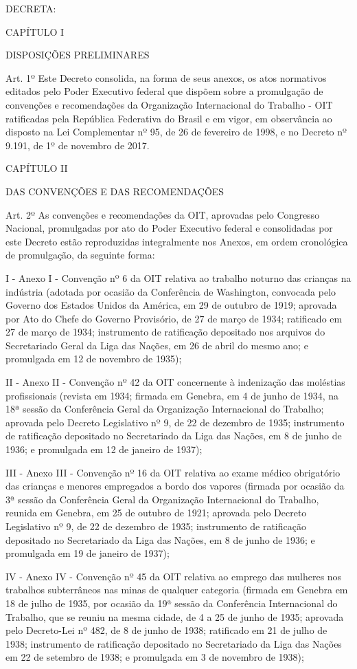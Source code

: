 \documentclass[
]{book}
\begin{document}
DECRETA:

CAPÍTULO I

DISPOSIÇÕES PRELIMINARES

Art. 1º Este Decreto consolida, na forma de seus anexos, os atos normativos editados pelo Poder Executivo federal que dispõem sobre a promulgação de convenções e recomendações da Organização Internacional do Trabalho - OIT ratificadas pela República Federativa do Brasil e em vigor, em observância ao disposto na Lei Complementar nº 95, de 26 de fevereiro de 1998, e no Decreto nº 9.191, de 1º de novembro de 2017.

CAPÍTULO II

DAS CONVENÇÕES E DAS RECOMENDAÇÕES

Art. 2º As convenções e recomendações da OIT, aprovadas pelo Congresso Nacional, promulgadas por ato do Poder Executivo federal e consolidadas por este Decreto estão reproduzidas integralmente nos Anexos, em ordem cronológica de promulgação, da seguinte forma:

I - Anexo I - Convenção nº 6 da OIT relativa ao trabalho noturno das crianças na indústria (adotada por ocasião da Conferência de Washington, convocada pelo Governo dos Estados Unidos da América, em 29 de outubro de 1919; aprovada por Ato do Chefe do Governo Provisório, de 27 de março de 1934; ratificado em 27 de março de 1934; instrumento de ratificação depositado nos arquivos do Secretariado Geral da Liga das Nações, em 26 de abril do mesmo ano; e promulgada em 12 de novembro de 1935);

II - Anexo II - Convenção nº 42 da OIT concernente à indenização das moléstias profissionais (revista em 1934; firmada em Genebra, em 4 de junho de 1934, na 18ª sessão da Conferência Geral da Organização Internacional do Trabalho; aprovada pelo Decreto Legislativo nº 9, de 22 de dezembro de 1935; instrumento de ratificação depositado no Secretariado da Liga das Nações, em 8 de junho de 1936; e promulgada em 12 de janeiro de 1937);

III - Anexo III - Convenção nº 16 da OIT relativa ao exame médico obrigatório das crianças e menores empregados a bordo dos vapores (firmada por ocasião da 3ª sessão da Conferência Geral da Organização Internacional do Trabalho, reunida em Genebra, em 25 de outubro de 1921; aprovada pelo Decreto Legislativo nº 9, de 22 de dezembro de 1935; instrumento de ratificação depositado no Secretariado da Liga das Nações, em 8 de junho de 1936; e promulgada em 19 de janeiro de 1937);

IV - Anexo IV - Convenção nº 45 da OIT relativa ao emprego das mulheres nos trabalhos subterrâneos nas minas de qualquer categoria (firmada em Genebra em 18 de julho de 1935, por ocasião da 19ª sessão da Conferência Internacional do Trabalho, que se reuniu na mesma cidade, de 4 a 25 de junho de 1935; aprovada pelo Decreto-Lei nº 482, de 8 de junho de 1938; ratificado em 21 de julho de 1938; instrumento de ratificação depositado no Secretariado da Liga das Nações em 22 de setembro de 1938; e promulgada em 3 de novembro de 1938);
\end{document}
